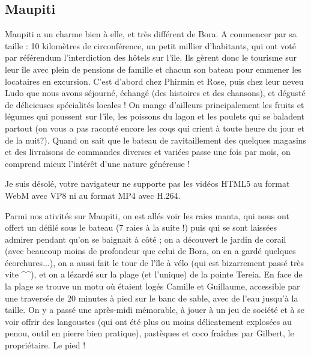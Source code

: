 \hypertarget{maupiti}{%
\subsection{Maupiti}\label{maupiti}}

Maupiti a un charme bien à elle, et très différent de Bora. A commencer
par sa taille : 10 kilomètres de circonférence, un petit millier
d'habitants, qui ont voté par référendum l'interdiction des hôtels sur
l'île. Ils gèrent donc le tourisme sur leur île avec plein de pensions
de famille et chacun son bateau pour emmener les locataires en
excursion. C'est d'abord chez Phirmin et Rose, puis chez leur neveu Ludo
que nous avons séjourné, échangé (des histoires et des chansons), et
dégusté de délicieuses spécialités locales ! On mange d'ailleurs
principalement les fruits et légumes qui poussent sur l'île, les
poissons du lagon et les poulets qui se baladent partout (on vous a pas
raconté encore les coqs qui crient à toute heure du jour et de la
nuit?). Quand on sait que le bateau de ravitaillement des quelques
magasins et des livraisons de commandes diverses et variées passe une
fois par mois, on comprend mieux l'intérêt d'une nature généreuse !

Je suis désolé, votre navigateur ne supporte pas les vidéos HTML5 au
format WebM avec VP8 ni au format MP4 avec H.264.

Parmi nos ativités sur Maupiti, on est allés voir les raies manta, qui
nous ont offert un défilé sous le bateau (7 raies à la suite !) puis qui
se sont laissées admirer pendant qu'on se baignait à côté ; on a
découvert le jardin de corail (avec beaucoup moins de profondeur que
celui de Bora, on en a gardé quelques écorchures...), on a aussi fait le
tour de l'île à vélo (qui est bizarrement passé très vite \^{}\^{}), et
on a lézardé sur la plage (et l'unique) de la pointe Tereia. En face de
la plage se trouve un motu où étaient logés Camille et Guillaume,
accessible par une traversée de 20 minutes à pied sur le banc de sable,
avec de l'eau jusqu'à la taille. On y a passé une après-midi mémorable,
à jouer à un jeu de société et à se voir offrir des langoustes (qui ont
été plus ou moins délicatement explosées au penou, outil en pierre bien
pratique), pastèques et coco fraîches par Gilbert, le propriétaire. Le
pied !


